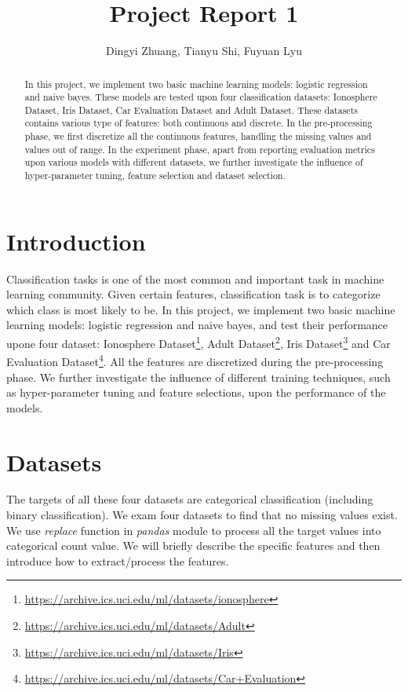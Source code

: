 \documentclass[11pt]{scrartcl}
\title{Project Report 1}
\author{Dingyi Zhuang, Tianyu Shi, Fuyuan Lyu}
\begin{document}
\maketitle

\begin{abstract}
In this project, we implement two basic machine learning models: logistic regression and naive bayes. These models are tested upon four classification datasets: Ionosphere Dataset, Iris Dataset, Car Evaluation Dataset and Adult Dataset. These datasets contains various type of features: both continuous and discrete. In the pre-processing phase, we first discretize all the continuous features, handling the missing values and values out of range. In the experiment phase, apart from reporting evaluation metrics upon various models with different datasets, we further investigate the influence of hyper-parameter tuning, feature selection and dataset selection.

\end{abstract}

\section{Introduction}
Classification tasks is one of the most common and important task in machine learning community. Given certain features, classification task is to categorize which class is most likely to be. In this project, we implement two basic machine learning models: logistic regression and naive bayes, and test their performance upone four dataset: Ionosphere Dataset\footnote{\url{https://archive.ics.uci.edu/ml/datasets/ionosphere}}, Adult Dataset\footnote{\url{https://archive.ics.uci.edu/ml/datasets/Adult}}, Iris Dataset\footnote{\url{https://archive.ics.uci.edu/ml/datasets/Iris}} and Car Evaluation Dataset\footnote{\url{https://archive.ics.uci.edu/ml/datasets/Car+Evaluation}}. All the features are discretized during the pre-processing phase. We further investigate the influence of different training techniques, such as hyper-parameter tuning and feature selections, upon the performance of the models.

\section{Datasets}
The targets of all these four datasets are categorical classification (including binary classification). We exam four datasets to find that no missing values exist. We use \textit{replace} function in \textit{pandas} module to process all the target values into categorical count value. We will briefly describe the specific features and then introduce how to extract/process the features.
\end{document}
